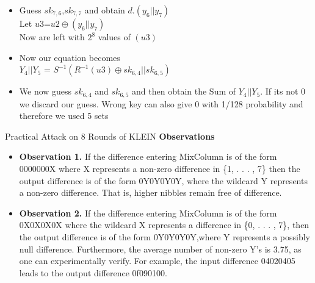 \begin{frame}
	\begin{itemize}
	
		\item Guess $sk_{7,6}$,$sk_{7,7}$ and obtain 
		$d.(y_{6}||y_{7})$\\
		Let $u3$=$u2 \oplus (y_{6}||y_{7})$  \\  
		Now are left with $2^8$ values of $(u3)$ \\
		\item Now our equation becomes \\
		$Y_{4}||Y_{5}$ = $S^{-1}(R^{-1}(u3)
		\oplus sk_{6,4} || sk_{6,5})$\\
		\item We now guess $sk_{6,4}$ and $sk_{6,5}$ and then obtain the Sum of $Y_{4}||Y_{5}$. If its not 0 we discard our guess. Wrong key can also give 0  with 1/128 probability and therefore we used 5 sets
	\end{itemize}
\end{frame}

\begin{frame}{Practical Attack on 8 Rounds of KLEIN}
	\textbf{Observations}
	\begin{itemize}
		\item \textbf{Observation 1.} If the difference entering MixColumn is of the
form 0000000X where X represents a non-zero difference in \{1, . . . , 7\} then the output difference is of the form 0Y0Y0Y0Y, where the wildcard Y represents a non-zero difference. That is, higher nibbles remain free of difference.\\
\item \textbf{Observation 2.} If the difference entering MixColumn is of the
form 0X0X0X0X where the wildcard X represents a difference in \{0, . . . , 7\}, then the output difference is of the form 0Y0Y0Y0Y,where Y represents a possibly null difference. Furthermore, the
average number of non-zero Y’s is 3.75, as one can experimentally verify. For example, the input difference 04020405 leads to the output difference 0f090100.\\
	\end{itemize}
\end{frame}

